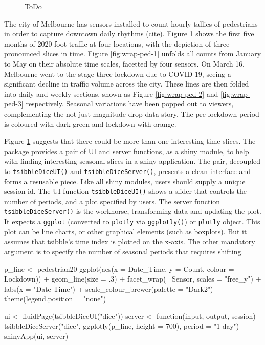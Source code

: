 \begin{Schunk}
\begin{figure}
{}

\caption[ToDo]{ToDo}\label{fig:wrap-ped}
\end{figure}
\end{Schunk}

The city of Melbourne has sensors installed to count hourly tallies of
pedestrians in order to capture downtown daily rhythms (cite). Figure
\ref{fig:wrap-ped} shows the first five months of 2020 foot traffic at
four locations, with the depiction of three pronounced slices in time.
Figure \ref{fig:wrap-ped-1} unfolds all counts from January to May on
their absolute time scales, facetted by four sensors. On March 16,
Melbourne went to the stage three lockdown due to COVID-19, seeing a
significant decline in traffic volume across the city. These lines are
then folded into daily and weekly sections, shown as Figure
\ref{fig:wrap-ped-2} and \ref{fig:wrap-ped-3} respectively. Seasonal
variations have been popped out to viewers, complementing the
not-just-magnitude-drop data story. The pre-lockdown period is coloured
with dark green and lockdown with orange.

Figure \ref{fig:wrap-ped} suggests that there could be more than one
interesting time slices. The  package provides a
pair of UI and server functions, as a shiny module, to help with finding
interesting seasonal slices in a shiny application. The pair, decoupled
to \texttt{tsibbleDiceUI()} and \texttt{tsibbleDiceServer()}, presents a
clean interface and forms a resusable piece. Like all shiny modules,
users should supply a unique session id. The UI function
\texttt{tsibbleDiceUI()} shows a slider that controls the number of
periods, and a plot specified by users. The server function
\texttt{tsibbleDiceServer()} is the workhorse, transforming data and
updating the plot. It expects a \texttt{ggplot} (converted to
\texttt{plotly} via \texttt{ggplotly()}) or \texttt{plotly} object. This
plot can be line charts, or other graphical elements (such as boxplots).
But it assumes that tsibble's time index is plotted on the x-axis. The
other mandatory argument is to specify the number of seasonal periods
that requires shifting.

\begin{Schunk}
\begin{Sinput}
p_line <- pedestrian20 %
  ggplot(aes(x = Date_Time, y = Count, colour = Lockdown)) +
  geom_line(size = .3) +
  facet_wrap(~ Sensor, scales = "free_y") +
  labs(x = "Date Time") +
  scale_colour_brewer(palette = "Dark2") +
  theme(legend.position = "none")

ui <- fluidPage(tsibbleDiceUI("dice"))
server <- function(input, output, session) {
  tsibbleDiceServer("dice", ggplotly(p_line, height = 700), period = "1 day")
}
shinyApp(ui, server)
\end{Sinput}
\end{Schunk}

